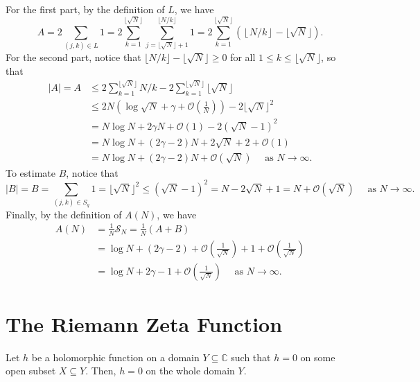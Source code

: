 \documentclass{elegantbook}
\begin{document}
\begin{problemset}[Exercises]
  \begin{solution}
    For the first part, by the definition of \(L\), we have
    \[
      A = 2 \sum_{(j,k)\in L} 1 = 2 \sum_{k=1}^{\lfloor \sqrt{N} \rfloor} \sum_{j=\lfloor \sqrt{N} \rfloor + 1}^{\lfloor N/k \rfloor} 1 = 2\sum_{k=1}^{\lfloor \sqrt{N} \rfloor} \left( \left\lfloor N/k \right\rfloor - \lfloor \sqrt{N} \rfloor \right).
    \]
    For the second part, notice that $\lfloor N/k \rfloor - \lfloor \sqrt{N} \rfloor \geq 0$ for all $1 \leq k \leq \lfloor \sqrt{N} \rfloor$, so that
    \[
    \begin{aligned}
      |A| = A &\leq 2 \sum_{k=1}^{\lfloor \sqrt{N} \rfloor} N/k - 2 \sum_{k=1}^{\lfloor \sqrt{N} \rfloor} \lfloor \sqrt{N} \rfloor \\
      &\leq 2N \left( \log \sqrt{N} + \gamma + \mathcal{O}\left( \frac{1}{N} \right) \right) - 2 \lfloor \sqrt{N} \rfloor^2 \\
      &= N \log N + 2\gamma N + \mathcal{O}(1) - 2(\sqrt{N} - 1)^2 \\
      &= N \log N + (2\gamma - 2)N + 2\sqrt{N} + 2 + \mathcal{O}(1) \\
      &= N \log N + (2\gamma - 2)N + \mathcal{O}(\sqrt{N}) \quad \text{ as } N \to \infty.
    \end{aligned}
    \]
    To estimate $B$, notice that
    \[
      |B| = B = \sum_{(j,k) \in S_q} 1 = \lfloor \sqrt{N} \rfloor^2 \leq (\sqrt{N} - 1)^2 = N - 2\sqrt{N} + 1 = N + \mathcal{O}(\sqrt{N}) \quad \text{ as } N \to \infty.
    \]
    Finally, by the definition of $A(N)$, we have
    \[
    \begin{aligned}
      A(N) &= \frac{1}{N} \mathcal{S}_N= \frac{1}{N} (A + B) \\
      &= \log N + (2\gamma - 2) + \mathcal{O}\left( \frac{1}{\sqrt{N}} \right) + 1 + \mathcal{O}\left( \frac{1}{\sqrt{N}} \right) \\
      &= \log N + 2\gamma - 1 + \mathcal{O}\left( \frac{1}{\sqrt{N}} \right) \quad \text{ as } N \to \infty.
    \end{aligned}
    \]
  \end{solution}

\end{problemset}


\chapter{The Riemann Zeta Function}

\begin{theorem} \label{thm:identity_theorem}
  Let $h$ be a holomorphic function on a domain $Y \subseteq \mathbb{C}$ such that $h=0$ on some open subset $X \subseteq Y$. Then, $h=0$ on the whole domain $Y$.
\end{theorem}
\end{document}
